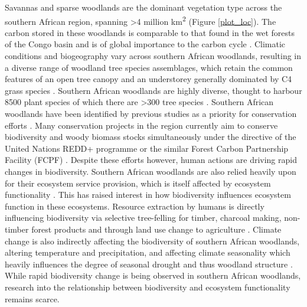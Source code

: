 \documentclass[11pt,a4paper]{article}
\begin{document}
Savannas and sparse woodlands are the dominant vegetation type across the southern African region, spanning >4 million km\textsuperscript{2} \citep{Ryan2016} (Figure \autoref{plot_loc}). The carbon stored in these woodlands is comparable to that found in the wet forests of the Congo basin and is of global importance to the carbon cycle \citep{Houghton2009, Mayaux2008}. Climatic conditions and biogeography vary across southern African woodlands, resulting in a diverse range of woodland tree species assemblages, which retain the common features of an open tree canopy and an understorey generally dominated by C4 grass species \citep{Frost1996}. Southern African woodlands are highly diverse, thought to harbour \textapprox{}8500 plant species of which there are >300 tree species \citep{Frost1996}. Southern African woodlands have been identified by previous studies as a priority for conservation efforts \citep{Brooks2006, Mittermeier2003}. Many conservation projects in the region currently aim to conserve biodiversity and woody biomass stocks simultaneously under the directive of the United Nations REDD+ programme or the similar Forest Carbon Partnership Facility (FCPF) \citep{Hinsley2015}. Despite these efforts however, human actions are driving rapid changes in biodiversity. Southern African woodlands are also relied heavily upon for their ecosystem service provision, which is itself affected by ecosystem functionality \citep{Schulze1994}. This has raised interest in how biodiversity influences ecosystem function in these ecosystems. Resource extraction by humans is directly influencing biodiversity via selective tree-felling for timber, charcoal making, non-timber forest products and through land use change to agriculture \citep{Aleman2016, Ryan2016}. Climate change is also indirectly affecting the biodiversity of southern African woodlands, altering temperature and precipitation, and affecting climate seasonality which heavily influences the degree of seasonal drought and thus woodland structure \citep{Scholes2004, Eldridge2012}. While rapid biodiversity change is being observed in southern African woodlands, research into the relationship between biodiversity and ecosystem functionality remains scarce.
\end{document}

